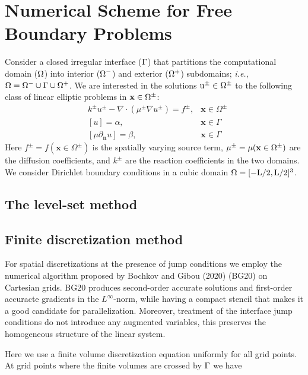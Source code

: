 \documentclass{elsarticle}
\begin{document}
\section{Numerical Scheme for Free Boundary Problems}
Consider a closed irregular interface ($\rm \Gamma$) that partitions the computational domain ($\rm \Omega$) into interior ($\rm \Omega^-$) and exterior ($\rm \Omega^+$) subdomains; \textit{i.e.}, $\rm \Omega=\Omega^- \cup \Gamma \cup \Omega^+$. We are interested in the solutions $\rm u^\pm\in \Omega^\pm$ to the following class of linear elliptic problems in  $\rm \mathbf{x}\in\Omega^\pm$:
\begin{align*}
&k^{\pm}u^{\pm} - \nabla \cdot (\mu^{\pm}\nabla u^\pm)=f^{\pm}, & \mathbf{x}\in\Omega^\pm\\
&[u]=\alpha, & \mathbf{x} \in \Gamma\\
&[\mu \partial_{\mathbf{n}}u]=\beta, & \mathbf{x} \in \Gamma
\end{align*}
Here $f^\pm=f(\mathbf{x} \in \Omega^\pm)$ is the spatially varying source term, $\rm \mu^\pm=\mu(\mathbf{x} \in \Omega^\pm)$  are the diffusion coefficients, and $k^\pm$ are the reaction coefficients in the two domains. We consider Dirichlet boundary conditions in a cubic domain $\rm \Omega=[-L/2,L/2]^3$.


\subsection{The level-set method}

\subsection{Finite discretization method}

For spatial discretizations at the presence of jump conditions we employ the numerical algorithm proposed by Bochkov and Gibou (2020) \cite{bochkov2020solving} (BG20) on Cartesian grids. BG20 produces second-order accurate solutions and first-order accuracte gradients in the $L^\infty$-norm, while having a compact stencil that makes it a good candidate for parallelization. Moreover, treatment of the interface jump conditions do not introduce any augmented variables, this preserves the homogeneous structure of the linear system. 

Here we use a finite volume discretization equation uniformly for all grid points. At grid points where the finite volumes are crossed by $\rm \Gamma$ we have
\end{document}
